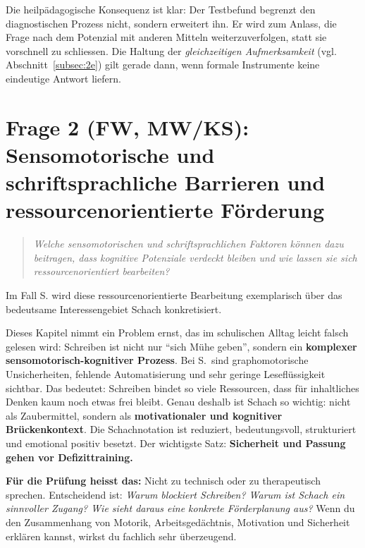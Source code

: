 \documentclass[ngerman, a4paper]{article}
\begin{document}
Die heilpädagogische Konsequenz ist klar: Der Testbefund begrenzt den
diagnostischen Prozess nicht, sondern erweitert ihn. Er wird zum Anlass, die
Frage nach dem Potenzial mit anderen Mitteln weiterzuverfolgen, statt sie
vorschnell zu schliessen. Die Haltung der \textit{gleichzeitigen Aufmerksamkeit}
(vgl. Abschnitt~\ref{subsec:2e}) gilt gerade dann, wenn formale Instrumente keine eindeutige
Antwort liefern.

\newpage
\section{Frage 2 (FW, MW/KS): Sensomotorische und schriftsprachliche Barrieren
  und ressourcenorientierte Förderung}
\label{sec:frage2}

\begin{quote}\itshape
  Welche sensomotorischen und schriftsprachlichen
  Faktoren können dazu beitragen, dass kognitive Potenziale verdeckt bleiben
  und wie lassen sie sich
  ressourcenorientiert bearbeiten?
\end{quote}

Im Fall S. wird diese ressourcenorientierte Bearbeitung exemplarisch über
das bedeutsame Interessengebiet Schach konkretisiert.

\begin{kapitelueberblick}
  Dieses Kapitel nimmt ein Problem ernst, das im schulischen Alltag leicht falsch
  gelesen wird: Schreiben ist nicht nur \enquote{sich Mühe geben}, sondern ein
  \textbf{komplexer sensomotorisch-kognitiver Prozess}. Bei S.\ sind
  graphomotorische Unsicherheiten, fehlende Automatisierung und sehr
  geringe Leseflüssigkeit sichtbar. Das bedeutet: Schreiben bindet so
  viele Ressourcen, dass für inhaltliches Denken kaum noch etwas frei
  bleibt. Genau deshalb ist Schach so wichtig: nicht als Zaubermittel,
  sondern als \textbf{motivationaler und kognitiver Brückenkontext}.
  Die Schachnotation ist reduziert, bedeutungsvoll, strukturiert und
  emotional positiv besetzt. Der wichtigste Satz: \textbf{Sicherheit
    und Passung gehen vor Defizittraining.}

  \medskip\textbf{Für die Prüfung heisst das:} Nicht zu technisch oder
  zu therapeutisch sprechen. Entscheidend ist: \textit{Warum blockiert
    Schreiben? Warum ist Schach ein sinnvoller Zugang? Wie sieht daraus
    eine konkrete Förderplanung aus?} Wenn du den Zusammenhang von Motorik,
  Arbeitsgedächtnis, Motivation und Sicherheit erklären kannst, wirkst du
  fachlich sehr überzeugend.
\end{kapitelueberblick}
\end{document}
